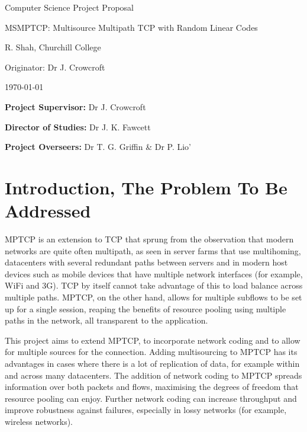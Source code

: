 \documentclass[12pt,a4paper,twoside]{article}
\begin{document}
\vfil

\centerline{\Large Computer Science Project Proposal}
\vspace{0.4in}
\centerline{\Large MSMPTCP: Multisource Multipath TCP with Random Linear Codes}
\vspace{0.4in}
\centerline{\large R. Shah, Churchill College}
\vspace{0.3in}
\centerline{\large Originator: Dr J. Crowcroft}
\vspace{0.3in}
\centerline{\large \today}

\vfil

\noindent
{\bf Project Supervisor:} Dr J. Crowcroft
\vspace{0.2in}

\noindent
{\bf Director of Studies:} Dr J. K. Fawcett
\vspace{0.2in}
\noindent
 
\noindent
{\bf Project Overseers:} Dr T. G. Griffin  \& Dr P. Lio'



\section*{Introduction, The Problem To Be Addressed}
MPTCP is an extension to TCP that sprung from the observation that modern networks are quite often multipath, as seen in server farms that use multihoming, datacenters with several redundant paths between servers and in modern host devices such as mobile devices that have multiple network interfaces (for example, WiFi and 3G). TCP by itself cannot take advantage of this to load balance across multiple paths. MPTCP, on the other hand, allows for multiple subflows to be set up for a single session, reaping the benefits of resource pooling using multiple paths in the network, all transparent to the application. \cite{mptcp}

This project aims to extend MPTCP, to incorporate network coding and to allow for multiple sources for the connection. Adding multisourcing to MPTCP has its advantages in cases where there is a lot of replication of data, for example within and across many datacenters. The addition of network coding to MPTCP spreads information over both packets and flows, maximising the degrees of freedom that resource pooling can enjoy. Further network coding can increase throughput and improve robustness against failures, especially in lossy networks (for example, wireless networks). \cite{nc-tcp}
\end{document}
